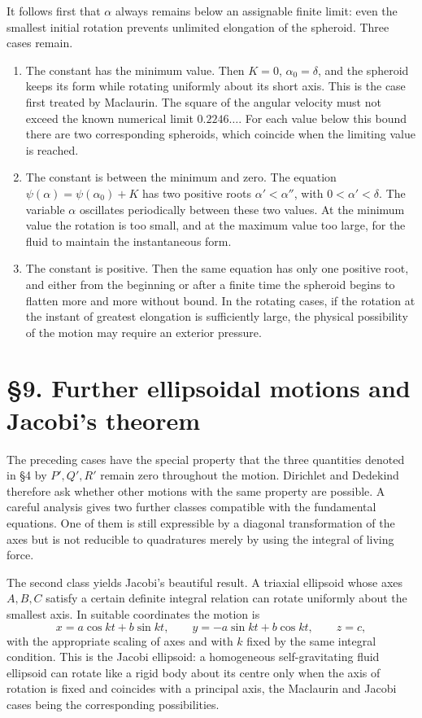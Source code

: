 \documentclass[11pt]{article}
\begin{document}
It follows first that \(\alpha\) always remains below an assignable finite limit: even the smallest initial rotation prevents unlimited elongation of the spheroid.  Three cases remain.

\begin{enumerate}[label=\arabic*)]
\item The constant has the minimum value.  Then \(K=0\), \(\alpha_0=\delta\), and the spheroid keeps its form while rotating uniformly about its short axis.  This is the case first treated by Maclaurin.  The square of the angular velocity must not exceed the known numerical limit \(0.2246\ldots\).  For each value below this bound there are two corresponding spheroids, which coincide when the limiting value is reached.

\item The constant is between the minimum and zero.  The equation \(\psi(\alpha)=\psi(\alpha_0)+K\) has two positive roots \(\alpha'<\alpha''\), with \(0<\alpha'<\delta\).  The variable \(\alpha\) oscillates periodically between these two values.  At the minimum value the rotation is too small, and at the maximum value too large, for the fluid to maintain the instantaneous form.

\item The constant is positive.  Then the same equation has only one positive root, and either from the beginning or after a finite time the spheroid begins to flatten more and more without bound.  In the rotating cases, if the rotation at the instant of greatest elongation is sufficiently large, the physical possibility of the motion may require an exterior pressure.
\end{enumerate}

\section*{\S9. Further ellipsoidal motions and Jacobi's theorem}

The preceding cases have the special property that the three quantities denoted in \S4 by \(P',Q',R'\) remain zero throughout the motion.  Dirichlet and Dedekind therefore ask whether other motions with the same property are possible.  A careful analysis gives two further classes compatible with the fundamental equations.  One of them is still expressible by a diagonal transformation of the axes but is not reducible to quadratures merely by using the integral of living force.

The second class yields Jacobi's beautiful result.  A triaxial ellipsoid whose axes \(A,B,C\) satisfy a certain definite integral relation can rotate uniformly about the smallest axis.  In suitable coordinates the motion is
\begin{equation}
 x=a\cos kt+b\sin kt,
 \qquad y=-a\sin kt+b\cos kt,
 \qquad z=c,
\end{equation}
with the appropriate scaling of axes and with \(k\) fixed by the same integral condition.  This is the Jacobi ellipsoid: a homogeneous self-gravitating fluid ellipsoid can rotate like a rigid body about its centre only when the axis of rotation is fixed and coincides with a principal axis, the Maclaurin and Jacobi cases being the corresponding possibilities.
\end{document}
